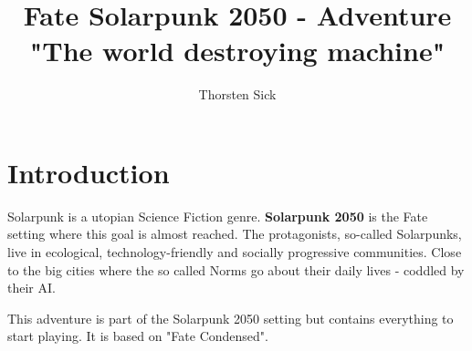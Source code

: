 \documentclass{book}
\title{Fate Solarpunk 2050 - Adventure "The world destroying machine"}
\author{Thorsten Sick}
\begin{document}
\chapter{Introduction}

Solarpunk is a utopian Science Fiction genre. \textbf{Solarpunk 2050} is the Fate setting where this goal is almost reached. The protagonists, so-called Solarpunks, live in ecological, technology-friendly and socially progressive communities. Close to the big cities where the so called Norms go about their daily lives - coddled by their AI.

This adventure is part of the Solarpunk 2050 setting but contains everything to start playing. It is based on "Fate Condensed".


\end{document}
